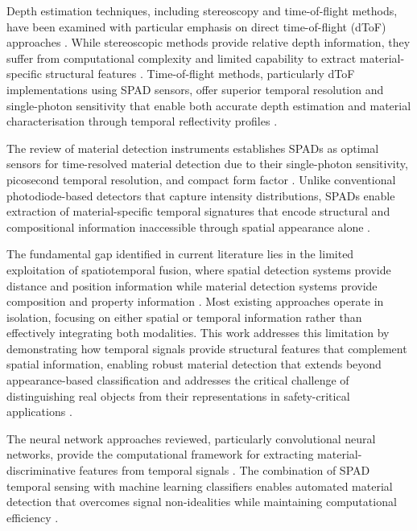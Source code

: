 \documentclass[12pt,a4paper,oneside]{report}
\begin{document}
Depth estimation techniques, including stereoscopy and time-of-flight methods, have been examined with particular emphasis on direct time-of-flight (dToF) approaches \cite{laga2022}. While stereoscopic methods provide relative depth information, they suffer from computational complexity and limited capability to extract material-specific structural features \cite{laga2022}. Time-of-flight methods, particularly dToF implementations using SPAD sensors, offer superior temporal resolution and single-photon sensitivity that enable both accurate depth estimation and material characterisation through temporal reflectivity profiles \cite{su2016,becker2023,tafone2023}.

The review of material detection instruments establishes SPADs as optimal sensors for time-resolved material detection due to their single-photon sensitivity, picosecond temporal resolution, and compact form factor \cite{piron2020}. Unlike conventional photodiode-based detectors that capture intensity distributions, SPADs enable extraction of material-specific temporal signatures that encode structural and compositional information inaccessible through spatial appearance alone \cite{su2016,becker2023}.

The fundamental gap identified in current literature lies in the limited exploitation of spatiotemporal fusion, where spatial detection systems provide distance and position information while material detection systems provide composition and property information \cite{gadzicki2020,yang2023,yang2024}. Most existing approaches operate in isolation, focusing on either spatial or temporal information rather than effectively integrating both modalities. This work addresses this limitation by demonstrating how temporal signals provide structural features that complement spatial information, enabling robust material detection that extends beyond appearance-based classification and addresses the critical challenge of distinguishing real objects from their representations in safety-critical applications \cite{su2016,becker2023,yang2024}.

The neural network approaches reviewed, particularly convolutional neural networks, provide the computational framework for extracting material-discriminative features from temporal signals \cite{lecun1998}. The combination of SPAD temporal sensing with machine learning classifiers enables automated material detection that overcomes signal non-idealities while maintaining computational efficiency \cite{becker2023,su2016}.
\end{document}
